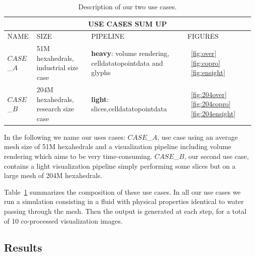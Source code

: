 \begin{table}
\centering
\begin{tabular}{|p{1.5cm}|p{3.0cm}|p{2.70cm}|p{1.50cm}|}
\hline
\multicolumn{4}{|c|}{\textbf{USE CASES SUM UP}}\\
\hline
NAME & SIZE & PIPELINE & FIGURES \\
\hline
$CASE$\_$A$ & 51M hexahedrals, \newline industrial size case & \textbf{heavy}:
\newline volume rendering, \newline celldatatopointdata \newline and glyphs  &
~\ref{fig:over} ~\ref{fig:copro} ~\ref{fig:ensight}\\
\hline
$CASE$\_$B$ & 204M hexahedrals, \newline research size case & \textbf{light}:
\newline 9 slices,\newline celldatatopointdata  & ~\ref{fig:204over}
~\ref{fig:204copro} ~\ref{fig:204ensight} \\
\hline
\end{tabular}
\caption{Description of our two use cases.}
\label{fig:tab}
\vspace{-0.15in}
\end{table}
In the following we name our uses cases:
$CASE$\_$A$, use case using an average mesh size of 51M hexahedrals and a
visualization pipeline including volume rendering which aims to be very time-consuming.
$CASE$\_$B$, our second use case, contains a light visualization pipeline simply
performing some slices but on a large mesh of 204M hexahedrals.

Table~\ref{fig:tab} summarizes the composition of these use cases. In all our use cases we
run a simulation consisting in a fluid with physical properties identical to
water passing through the mesh. Then the output is generated at each step, for a
total of 10 co-processed visualization images.

\subsection{Results}

